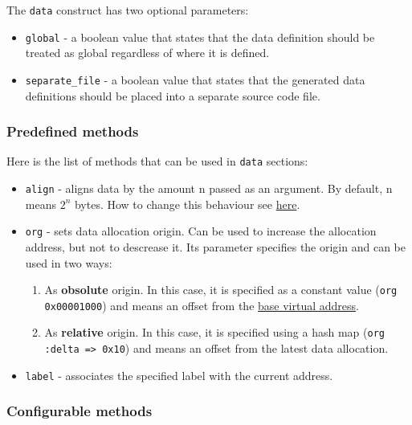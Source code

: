 \documentclass[oneside,final,12pt]{extreport}
\begin{document}
The \texttt{data} construct has two optional parameters:

\begin{itemize}
\item \texttt{global} - a boolean value that states that the data definition should be
      treated as global regardless of where it is defined.
\item \texttt{separate{\_}file} - a boolean value that states that the generated data
      definitions should be placed into a separate source code file.
\end{itemize}

\subsubsection{Predefined methods}

Here is the list of methods that can be used in \texttt{data} sections:

\begin{itemize}
\item \texttt{align} - aligns data by the amount n passed as an argument. By default, n means
      $2^n$ bytes. How to change this behaviour see \hyperref[managing_address_alignment]{here}.

\item \texttt{org} - sets data allocation origin. Can be used to increase the allocation address,
      but not to descrease it. Its parameter specifies the origin and can be used in two ways:
      \begin{enumerate}
      \item As \textbf{obsolute} origin. In this case, it is specified as a constant value
            (\texttt{org 0x00001000}) and means an offset from the
            \hyperref[base_virtual_address]{base virtual address}.
      \item As \textbf{relative} origin. In this case, it is specified using a hash map
            (\texttt{org :delta => 0x10}) and means an offset from the latest data allocation.
      \end{enumerate}

\item \texttt{label} - associates the specified label with the current address.  
\end{itemize}

\subsubsection{Configurable methods}
\end{document}

